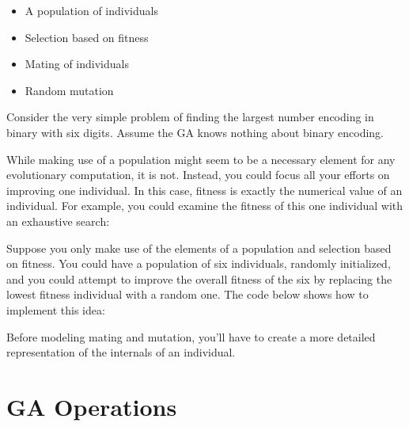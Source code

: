 \begin{itemize}
\item A population of individuals
\item Selection based on fitness
\item Mating of individuals
\item Random mutation
\end{itemize}
Consider the very simple problem of finding the largest number encoding
in binary with six digits. Assume the GA knows nothing about binary
encoding.

While making use of a population might seem to be a necessary element
for any evolutionary computation, it is not. Instead, you could focus
all your efforts on improving one individual. In this case, fitness is
exactly the numerical value of an individual. For example, you could
examine the fitness of this one individual with an exhaustive search:


Suppose you only make use of the elements of a population and selection
based on fitness. You could have a population of six individuals,
randomly initialized, and you could attempt to improve the overall
fitness of the six by replacing the lowest fitness individual with a
random one. The code below shows how to implement this idea:


Before modeling mating and mutation, you'll have to
create a more detailed representation of the internals of an
individual.

\section{GA Operations}

